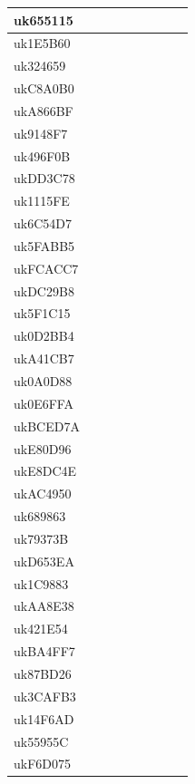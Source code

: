 \documentclass[english]{article}
\begin{document}
\begin{center}
\begin{longtable}{|l|c|c|c|c|c|c|c|c|}
uk655115 &  &  &  &  &  & & \\
\hline
uk1E5B60 &  &  &  &  &  & & \\
\hline
uk324659 &  &  &  &  &  & & \\
\hline
ukC8A0B0 &  &  &  &  &  & & \\
\hline
ukA866BF &  &  &  &  &  & & \\
\hline
uk9148F7 &  &  &  &  &  & & \\
\hline
uk496F0B &  &  &  &  &  & & \\
\hline
ukDD3C78 &  &  &  &  &  & & \\
\hline
uk1115FE &  &  &  &  &  & & \\
\hline
uk6C54D7 &  &  &  &  &  & & \\
\hline
uk5FABB5 &  &  &  &  &  & & \\
\hline
ukFCACC7 &  &  &  &  &  & & \\
\hline
ukDC29B8 &  &  &  &  &  & & \\
\hline
uk5F1C15 &  &  &  &  &  & & \\
\hline
uk0D2BB4 &  &  &  &  &  & & \\
\hline
ukA41CB7 &  &  &  &  &  & & \\
\hline
uk0A0D88 &  &  &  &  &  & & \\
\hline
uk0E6FFA &  &  &  &  &  & & \\
\hline
ukBCED7A &  &  &  &  &  & & \\
\hline
ukE80D96 &  &  &  &  &  & & \\
\hline
ukE8DC4E &  &  &  &  &  & & \\
\hline
ukAC4950 &  &  &  &  &  & & \\
\hline
uk689863 &  &  &  &  &  & & \\
\hline
uk79373B &  &  &  &  &  & & \\
\hline
ukD653EA &  &  &  &  &  & & \\
\hline
uk1C9883 &  &  &  &  &  & & \\
\hline
ukAA8E38 &  &  &  &  &  & & \\
\hline
uk421E54 &  &  &  &  &  & & \\
\hline
ukBA4FF7 &  &  &  &  &  & & \\
\hline
uk87BD26 &  &  &  &  &  & & \\
\hline
uk3CAFB3 &  &  &  &  &  & & \\
\hline
uk14F6AD &  &  &  &  &  & & \\
\hline
uk55955C &  &  &  &  &  & & \\
\hline
ukF6D075 &  &  &  &  &  & & \\

\end{longtable}
\end{center}
\end{document}
